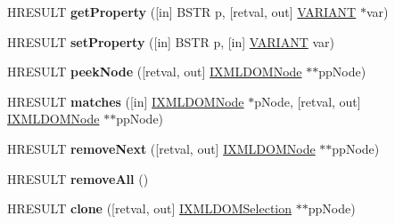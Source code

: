 \begin{DoxyCompactItemize}
H\+R\+E\+S\+U\+LT {\bfseries get\+Property} (\mbox{[}in\mbox{]} B\+S\+TR p, \mbox{[}retval, out\mbox{]} \hyperlink{structtag_v_a_r_i_a_n_t}{V\+A\+R\+I\+A\+NT} $\ast$var)
\item 
\mbox{\label{interface_m_s_x_m_l2_1_1_i_x_m_l_d_o_m_selection_a39b5027eba24a064505f422e110721e1}} 
H\+R\+E\+S\+U\+LT {\bfseries set\+Property} (\mbox{[}in\mbox{]} B\+S\+TR p, \mbox{[}in\mbox{]} \hyperlink{structtag_v_a_r_i_a_n_t}{V\+A\+R\+I\+A\+NT} var)
\item 
\mbox{\label{interface_m_s_x_m_l2_1_1_i_x_m_l_d_o_m_selection_a34b62a6ec40dabf375bc3401d03e43f7}} 
H\+R\+E\+S\+U\+LT {\bfseries peek\+Node} (\mbox{[}retval, out\mbox{]} \hyperlink{interface_m_s_x_m_l2_1_1_i_x_m_l_d_o_m_node}{I\+X\+M\+L\+D\+O\+M\+Node} $\ast$$\ast$pp\+Node)
\item 
\mbox{\label{interface_m_s_x_m_l2_1_1_i_x_m_l_d_o_m_selection_a81f5c542ba8d45e5fe859518e1a69466}} 
H\+R\+E\+S\+U\+LT {\bfseries matches} (\mbox{[}in\mbox{]} \hyperlink{interface_m_s_x_m_l2_1_1_i_x_m_l_d_o_m_node}{I\+X\+M\+L\+D\+O\+M\+Node} $\ast$p\+Node, \mbox{[}retval, out\mbox{]} \hyperlink{interface_m_s_x_m_l2_1_1_i_x_m_l_d_o_m_node}{I\+X\+M\+L\+D\+O\+M\+Node} $\ast$$\ast$pp\+Node)
\item 
\mbox{\label{interface_m_s_x_m_l2_1_1_i_x_m_l_d_o_m_selection_a1a8b9e181cd4f853cad4f2ee8f4c71c1}} 
H\+R\+E\+S\+U\+LT {\bfseries remove\+Next} (\mbox{[}retval, out\mbox{]} \hyperlink{interface_m_s_x_m_l2_1_1_i_x_m_l_d_o_m_node}{I\+X\+M\+L\+D\+O\+M\+Node} $\ast$$\ast$pp\+Node)
\item 
\mbox{\label{interface_m_s_x_m_l2_1_1_i_x_m_l_d_o_m_selection_aee6b923303a253243027671ffbba2bdd}} 
H\+R\+E\+S\+U\+LT {\bfseries remove\+All} ()
\item 
\mbox{\label{interface_m_s_x_m_l2_1_1_i_x_m_l_d_o_m_selection_aa594da55468deb3f4a8f32ced74fce2a}} 
H\+R\+E\+S\+U\+LT {\bfseries clone} (\mbox{[}retval, out\mbox{]} \hyperlink{interface_m_s_x_m_l2_1_1_i_x_m_l_d_o_m_selection}{I\+X\+M\+L\+D\+O\+M\+Selection} $\ast$$\ast$pp\+Node)

\end{DoxyCompactItemize}

